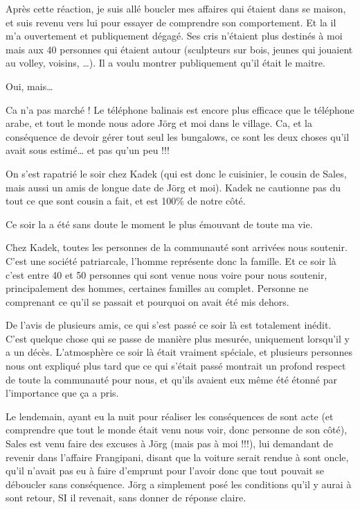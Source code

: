 Après cette réaction, je suis allé boucler mes affaires qui étaient dans se maison, et suis revenu vers lui pour essayer de comprendre son comportement. Et la il m’a ouvertement et publiquement dégagé. Ses cris n’étaient plus destinés à moi mais aux 40 personnes qui étaient autour (sculpteurs sur bois, jeunes qui jouaient au volley, voisins, …). Il a voulu montrer publiquement qu’il était le maitre.

Oui, mais…

Ca n’a pas marché ! Le téléphone balinais est encore plus efficace que le téléphone arabe, et tout le monde nous adore Jörg et moi dans le village. Ca, et la conséquence de devoir gérer tout seul les bungalows, ce sont les deux choses qu’il avait sous estimé… et pas qu’un peu !!!

On s’est rapatrié le soir chez Kadek (qui est donc le cuisinier, le cousin de Sales, mais aussi un amis de longue date de Jörg et moi). Kadek ne cautionne pas du tout ce que sont cousin a fait, et est 100\% de notre côté.

Ce soir la a été sans doute le moment le plus émouvant de toute ma vie.

Chez Kadek, toutes les personnes de la communauté sont arrivées nous soutenir. C’est une société patriarcale, l’homme représente donc la famille. Et ce soir là c’est entre 40 et 50 personnes qui sont venue nous voire pour nous soutenir, principalement des hommes, certaines familles au complet. Personne ne comprenant ce qu’il se passait et pourquoi on avait été mis dehors.

De l’avis de plusieurs amis, ce qui s’est passé ce soir là est totalement inédit. C’est quelque chose qui se passe de manière plus mesurée, uniquement lorsqu’il y a un décès. L’atmosphère ce soir là était vraiment spéciale, et plusieurs personnes nous ont expliqué plus tard que ce qui s’était passé montrait un profond respect de toute la communauté pour nous, et qu’ils avaient eux même été étonné par l’importance que ça a pris.

Le lendemain, ayant eu la nuit pour réaliser les conséquences de sont acte (et comprendre que tout le monde était venu nous voir, donc personne de son côté), Sales est venu faire des excuses à Jörg (mais pas à moi !!!), lui demandant de revenir dans l’affaire Frangipani, disant que la voiture serait rendue à sont oncle, qu’il n’avait pas eu à faire d’emprunt pour l’avoir donc que tout pouvait se déboucler sans conséquence. Jörg a simplement posé les conditions qu’il y aurai à sont retour, SI il revenait, sans donner de réponse claire.

